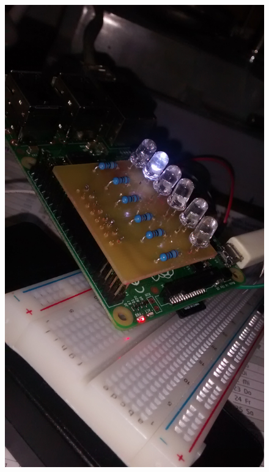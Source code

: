 \begin{figure}[H]
\includegraphics[height=0.255\textheight]{Chapters/Chapter5/Figures/estructuraFinal/pcb8}

\end{figure}
